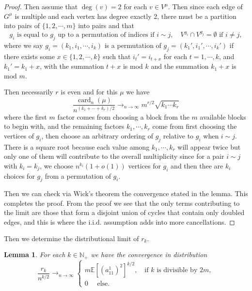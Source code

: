 \documentclass[12pt, reqno]{amsart}
\newtheorem{lemma}[theorem]{Lemma}
\theoremstyle{definition}
\theoremstyle{remark}
\numberwithin{equation}{section}
\begin{document}
\begin{proof}
Then assume that $\operatorname{deg}(v)=2$ for each $v\in V^\mu$. Then since each edge of $G^\mu$ is multiple and each vertex has degree exactly 2, there must be a partition into pairs of $\{1,2,\cdots,m\}$ into pairs and that 
$$
g_i\text{ is equal to }g_j\text{ up to a permutation of indices if }i\sim j,\quad V^{g_i}\cap V^{g_j}=\emptyset\text{ if } i\neq j,  
$$ where we say $g_i=(k_1,i_1,\cdots,i_k)$ is a permutation of $g_j=(k_1',i_1',\cdots,i_k')$ if there exists some $x\in\{1,2,\cdots,k\}$ such that $i_t'=i_{t+x}$ for each $t=1,\cdots,k$, and $k_1'=k_1+x$, with the summation $t+x$ is mod $k$ and the summation $k_1+x$ is mod $m$. 

Then necessarily $r$ is even and for this $\mu$ we have
$$
\frac{\operatorname{card}_n(\mu)}{n^{(k_1+\cdots+k_r)/2}}\to_{n\to\infty}m^{r/2}\sqrt{k_1\cdots k_r}
$$ where the first $m$ factor comes from choosing a block from the $m$ available blocks to begin with, and the remaining factors $k_1,\cdots,k_r$ come from first choosing the vertices of $g_i$, then choose an arbitrary ordering of $g_j$ relative to $g_i$ when $i\sim j$. There is a square root because each value among $k_1,\cdots,k_r$ will appear twice but only one of them will contribute to the overall multiplicity since for a pair $i\sim j$ with $k_i=k_j$, we choose $n^{k_i}(1+o(1))$ vertices for $g_i$ and then thee are $k_i$ choices for $g_j$ from a permutation of $g_i$.

    Then we can check via Wick's theorem the convergence stated in the lemma.
    This completes the proof. From the proof we see that the only terms contributing to the limit are those that form a disjoint union of cycles that contain only doubled edges, and this is where the i.i.d. assumption adds into more cancellations. 
\end{proof}

Then we determine the distributional limit of $r_k$.



\begin{lemma}
    For each $k\in\mathbb{N}_+$ we have the convergence in distribution 
    $$
\frac{r_k}{n^{k/2}}\to_{n\to\infty} \begin{cases}m\mathbb{E}[(a_{11}^1)^2]^{k/2},\quad \text{if $k$ is divisible by $2m$},\\ 0\quad\text{ else. }\end{cases}
    $$
\end{lemma}
\end{document}
